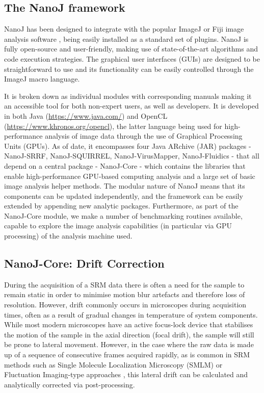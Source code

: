 \subsection*{The NanoJ framework}
 NanoJ has been designed to integrate with the popular ImageJ or Fiji image analysis software \cite{abramoff2004image,schindelin2012fiji}, being easily installed as a standard set of plugins. NanoJ is fully open-source and user-friendly, making use of state-of-the-art algorithms and code execution strategies. The graphical user interfaces (GUIs) are designed to be straightforward to use and its functionality can be easily controlled through the ImageJ macro language.

 It is broken down as individual modules with corresponding manuals making it an accessible tool for both non-expert users, as well as developers. It is developed in both Java (\href{https://www.java.com/}{https://www.java.com/}) and OpenCL (\href{https://www.khronos.org/opencl}{https://www.khronos.org/opencl}), the latter language being used for high-performance analysis of image data through the use of Graphical Processing Units (GPUs). As of date, it encompasses four Java ARchive (JAR) packages - NanoJ-SRRF, NanoJ-SQUIRREL, NanoJ-VirusMapper, NanoJ-Fluidics - that all depend on a central package - NanoJ-Core - which contains the libraries that enable high-performance GPU-based computing analysis and a large set of basic image analysis helper methods. The modular nature of NanoJ means that its components can be updated independently, and the framework can be easily extended by appending new analytic packages. Furthermore, as part of the NanoJ-Core module, we make a number of benchmarking routines available, capable to explore the image analysis capabilities (in particular via GPU processing) of the analysis machine used.

\subsection*{NanoJ-Core: Drift Correction}
 During the acquisition of a SRM data there is often a need for the sample to remain static in order to minimise motion blur artefacts and therefore loss of resolution. However, drift commonly occurs in microscopes during acquisition times, often as a result of gradual changes in temperature of system components. While most modern microscopes have an active focus-lock device that stabilises the motion of the sample in the axial direction (focal drift), the sample will still be prone to lateral movement. However, in the case where the raw data is made up of a sequence of consecutive frames acquired rapidly, as is common in SRM methods such as Single Molecule Localization Microscopy (SMLM) \cite{betzig2006imaging,rust2006sub} or Fluctuation Imaging-type approaches \cite{gustafsson2016fast,dertinger2009fast,cox2012bayesian}, this lateral drift can be calculated and analytically corrected via post-processing.

